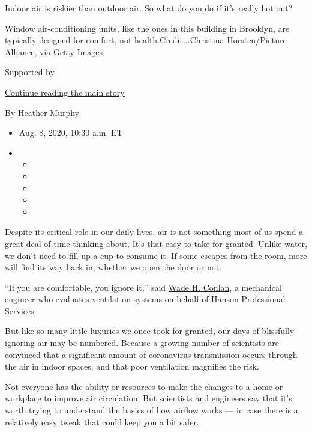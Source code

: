 Indoor air is riskier than outdoor air. So what do you do if it's really
hot out?

Window air-conditioning units, like the ones in this building in
Brooklyn, are typically designed for comfort, not
health.Credit...Christina Horsten/Picture Alliance, via Getty Images

Supported by

\protect\hyperlink{after-sponsor}{Continue reading the main story}

By \href{https://www.nytimes.com/by/heather-murphy}{Heather Murphy}

\begin{itemize}
\item
  Aug. 8, 2020, 10:30 a.m. ET
\item
  \begin{itemize}
  \item
  \item
  \item
  \item
  \item
  \end{itemize}
\end{itemize}

Despite its critical role in our daily lives, air is not something most
of us spend a great deal of time thinking about. It's that easy to take
for granted. Unlike water, we don't need to fill up a cup to consume it.
If some escapes from the room, more will find its way back in, whether
we open the door or not.

``If you are comfortable, you ignore it,'' said
\href{https://www.ashrae.org/professional-development/learning-portal/instructor-led-training/ashrae-instructors/wade-h-conlan}{Wade
H. Conlan}, a mechanical engineer who evaluates ventilation systems on
behalf of Hanson Professional Services.

But like so many little luxuries we once took for granted, our days of
blissfully ignoring air may be numbered. Because a growing number of
scientists are convinced that a significant amount of coronavirus
transmission occurs through the air in indoor spaces, and that poor
ventilation magnifies the risk.

Not everyone has the ability or resources to make the changes to a home
or workplace to improve air circulation. But scientists and engineers
say that it's worth trying to understand the basics of how airflow works
--- in case there is a relatively easy tweak that could keep you a bit
safer.

